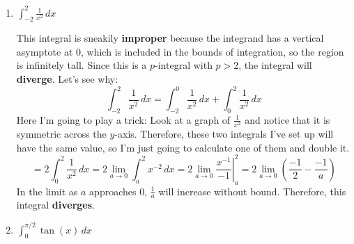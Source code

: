 \documentclass[10pt]{article}
\newenvironment{red}{\color{red}}{\ignorespacesafterend}
\begin{document}
\begin{enumerate}[leftmargin=0pt]
\begin{enumerate}
    \begin{red}
    This integral is \textbf{improper} because it is infinitely tall: the integrand has a vertical asymptote at $x=4$, which is included in the bounds of integration. I'm pretty sure this is going to \textbf{converge} because the power is $1/2 < 1$, but in order to figure out what it converges to, we'll need to do a substitution $u = 4-x$, $du = -dx$:
    \begin{align*}
        \int_1^4 \frac{1}{\sqrt{4-x}} \, dx &= \lim_{b\to 4}\int_1^b \frac{1}{\sqrt{4-x}}\, dx \\
        &= \lim_{b\to 4}\int_{x=1}^{x=b} \frac{1}{\sqrt{u}}\, (-du) 
        = -\lim_{b\to 4}\int_{x=1}^{x=b} u^{-1/2}\, du \\
        &= -\lim_{b\to 4}\left[ \frac{u^{1/2}}{1/2} \right|_{x=1}^{x=b}
        \intertext{Now we back-substitute before plugging in the bounds of integration so that we do not make a puppy cry:}
        &= -\lim_{b\to 4}\left[ \frac{(4-x)^{1/2}}{1/2} \right|_1^b 
        = -\lim_{b\to 4}\left[ \frac{(4-b)^{1/2}}{1/2} - \frac{3^{1/2}}{1/2} \right]
        = -(0 - 2\sqrt{3}) \\
        &= 2\sqrt{3}.
    \end{align*}
    \end{red}
    
    \pagebreak
    
    \item $\displaystyle \int_{-2}^2 \frac{1}{x^2} \, dx$
    
    \begin{red}
    This integral is sneakily \textbf{improper} because the integrand has a vertical asymptote at 0, which is included in the bounds of integration, so the region is infinitely tall. Since this is a $p$-integral with $p > 2$, the integral will \textbf{diverge}. Let's see why:
    \[\int_{-2}^2 \frac{1}{x^2}\, dx = \int_{-2}^0 \frac{1}{x^2}\, dx + \int_0^2 \frac{1}{x^2}\, dx\]
    Here I'm going to play a trick: Look at a graph of $\frac{1}{x^2}$ and notice that it is symmetric across the $y$-axis. Therefore, these two integrals I've set up will have the same value, so I'm just going to calculate one of them and double it.
    \[ = 2\int_0^2 \frac{1}{x^2}\, dx = 2\lim_{a\to 0} \int_a^2 x^{-2}\, dx = 2\lim_{a\to 0} \left.\frac{x^{-1}}{-1} \right|_a^2 = 2\lim_{a \to 0}\left(\frac{-1}{2} - \frac{-1}{a}\right) \]
    In the limit as $a$ approaches 0, $\frac{1}{a}$ will increase without bound. Therefore, this integral \textbf{diverges}. 
    \end{red}
    \item $\displaystyle \int_0^{\pi/2} \tan(x) \, dx$
    

\end{enumerate}
\end{enumerate}
\end{document}
